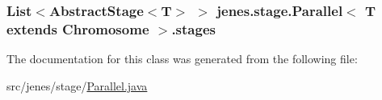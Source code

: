 \hypertarget{classjenes_1_1stage_1_1_parallel_3_01_t_01extends_01_chromosome_01_4_a4a31a724db62564311c6ab6c0c6a8037}{
\subsubsection[{stages}]{\setlength{\rightskip}{0pt plus 5cm}List$<$Abstract\-Stage$<$T$>$ $>$ jenes.\-stage.\-Parallel$<$ T extends Chromosome $>$.stages\hspace{0.3cm}{\ttfamily [private]}}}\label{classjenes_1_1stage_1_1_parallel_3_01_t_01extends_01_chromosome_01_4_a4a31a724db62564311c6ab6c0c6a8037}


The documentation for this class was generated from the following file\-:\begin{DoxyCompactItemize}
\item 
src/jenes/stage/\hyperlink{_parallel_8java}{Parallel.\-java}\end{DoxyCompactItemize}
